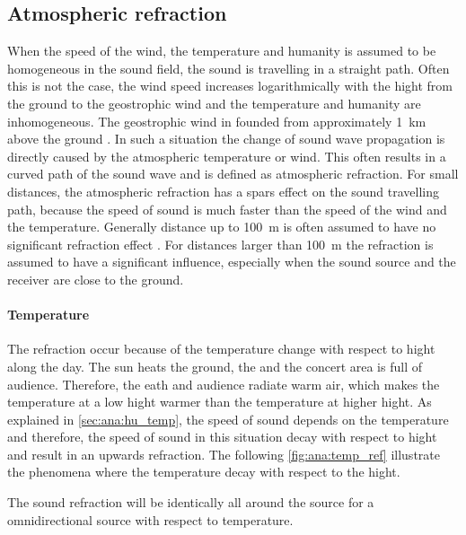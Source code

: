  
\subsection{Atmospheric refraction}
When the speed of the wind, the temperature and humanity is assumed to be homogeneous in the sound field, the sound is travelling in a straight path. Often this is not the case, the wind speed increases logarithmically with the hight from the ground to the geostrophic wind \citep{asmos_acous_2016} and the temperature and humanity are inhomogeneous. The geostrophic wind in founded from approximately \SI{1}{\kilo\meter} above the ground \citep{geostrophic_wind}.  In such a situation the change of sound wave propagation is directly caused by the atmospheric temperature or wind. This often results in a curved path of the sound wave and is defined as atmospheric refraction. For small distances, the atmospheric refraction has a spars effect on the sound travelling path, because the speed of sound is much faster than the speed of the wind and the temperature. Generally distance up to \SI{100}{\meter} is often assumed to have no significant refraction effect \citep{effect_of_wind}. For distances larger than \SI{100}{\meter} the refraction is assumed to have a significant influence, especially when the sound source and the receiver are close to the ground.  


\paragraph{Temperature} The refraction occur because of the temperature change with respect to hight along the day. The sun heats the ground, the and the concert area is full of audience. Therefore, the eath and audience radiate warm air, which makes the temperature at a low hight warmer than the temperature at higher hight. As explained in \autoref{sec:ana:hu_temp}, the speed of sound depends on the temperature and therefore, the speed of sound in this situation decay with respect to hight and result in an upwards refraction. The following \autoref{fig:ana:temp_ref} illustrate the phenomena where the temperature decay with respect to the hight.


The sound refraction will be identically all around the source for a omnidirectional source with respect to temperature.


